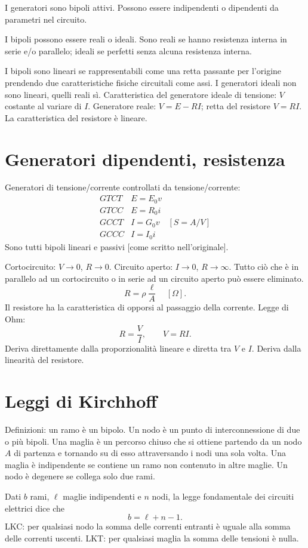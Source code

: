 \documentclass[11pt,a4paper]{article}
\newcommand{\pagina}[2]{\clearpage\section*{#2}}
\begin{document}
I generatori sono bipoli attivi. Possono essere indipendenti o dipendenti da parametri nel circuito.

I bipoli possono essere reali o ideali. Sono reali se hanno resistenza interna in serie e/o parallelo; ideali se perfetti senza alcuna resistenza interna.

I bipoli sono lineari se rappresentabili come una retta passante per l'origine prendendo due caratteristiche fisiche circuitali come assi. I generatori ideali non sono lineari, quelli reali sì. Caratteristica del generatore ideale di tensione: $V$ costante al variare di $I$. Generatore reale: $V=E-RI$; retta del resistore $V=RI$. La caratteristica del resistore è lineare.
\pagina{4}{Generatori dipendenti, resistenza}
Generatori di tensione/corrente controllati da tensione/corrente:
\[\begin{array}{c|c}GTCT&E=E_0v\\GTCC&E=R_0i\\GCCT&I=G_0v\quad[S=A/V]\\GCCC&I=I_0i\end{array}\]
Sono tutti bipoli lineari e passivi [come scritto nell'originale].

Cortocircuito: $V\to0$, $R\to0$. Circuito aperto: $I\to0$, $R\to\infty$. Tutto ciò che è in parallelo ad un cortocircuito o in serie ad un circuito aperto può essere eliminato.
\[R=\rho\frac{\ell}{A}\quad[\Omega].\]
Il resistore ha la caratteristica di opporsi al passaggio della corrente. Legge di Ohm:
\[R=\frac VI,\qquad V=RI.\]
Deriva direttamente dalla proporzionalità lineare e diretta tra $V$ e $I$. Deriva dalla linearità del resistore.
\pagina{5}{Leggi di Kirchhoff}
Definizioni: un ramo è un bipolo. Un nodo è un punto di interconnessione di due o più bipoli. Una maglia è un percorso chiuso che si ottiene partendo da un nodo $A$ di partenza e tornando su di esso attraversando i nodi una sola volta. Una maglia è indipendente se contiene un ramo non contenuto in altre maglie. Un nodo è degenere se collega solo due rami.

Dati $b$ rami, $\ell$ maglie indipendenti e $n$ nodi, la legge fondamentale dei circuiti elettrici dice che
\[b=\ell+n-1.\]
LKC: per qualsiasi nodo la somma delle correnti entranti è uguale alla somma delle correnti uscenti. LKT: per qualsiasi maglia la somma delle tensioni è nulla.
\end{document}
